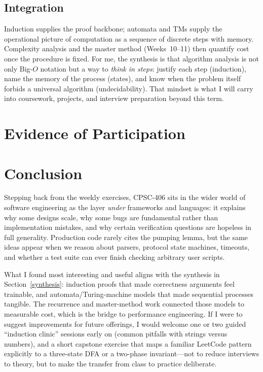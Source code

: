 \documentclass{article}
\theoremstyle{theorem}
\theoremstyle{definition}
\theoremstyle{remark}
\begin{document}
\subsection{Integration}\label{sec:synth-integration}

Induction supplies the proof backbone; automata and TMs supply the operational picture of computation as a sequence of discrete steps with memory. Complexity analysis and the master method (Weeks~10--11) then quantify cost once the procedure is fixed. For me, the synthesis is that algorithm analysis is not only Big-$O$ notation but a way to \emph{think in steps}: justify each step (induction), name the memory of the process (states), and know when the problem itself forbids a universal algorithm (undecidability). That mindset is what I will carry into coursework, projects, and interview preparation beyond this term.

\section{Evidence of Participation}

\section{Conclusion}\label{conclusion}

Stepping back from the weekly exercises, CPSC-406 sits in the wider world of software engineering as the layer \emph{under} frameworks and languages: it explains why some designs scale, why some bugs are fundamental rather than implementation mistakes, and why certain verification questions are hopeless in full generality. Production code rarely cites the pumping lemma, but the same ideas appear when we reason about parsers, protocol state machines, timeouts, and whether a test suite can ever finish checking arbitrary user scripts.

What I found most interesting and useful aligns with the synthesis in Section~\ref{synthesis}: induction proofs that made correctness arguments feel trainable, and automata/Turing-machine models that made sequential processes tangible. The recurrence and master-method work connected those models to measurable cost, which is the bridge to performance engineering. If I were to suggest improvements for future offerings, I would welcome one or two guided ``induction clinic'' sessions early on (common pitfalls with strings versus numbers), and a short capstone exercise that maps a familiar LeetCode pattern explicitly to a three-state DFA or a two-phase invariant---not to reduce interviews to theory, but to make the transfer from class to practice deliberate.
\end{document}
